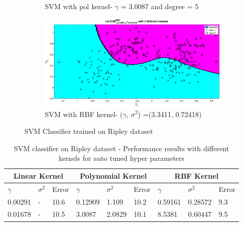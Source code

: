 {\begin{figure}[!ht]
\begin{subfigure}{.35\textwidth}
		\caption{SVM with pol kernel- $\gamma$ = 3.0087 and degree = 5}
		\label{fig:ripley_poly_svm}
	\end{subfigure}%
	\begin{subfigure}{.35\textwidth}
		\centering
		\captionsetup{width=0.8\linewidth}
		\includegraphics[height=.65\linewidth, width=0.9\linewidth]{Exercise1/Report/ripley/ripley_RBF_svm.eps}
		\caption{SVM with RBF kernel- ($\gamma$, $\sigma^2$) =(3.3411, 0.72418) } 
		\label{fig:ripley_RBF_svm}
	\end{subfigure}
	\caption{SVM Classifier trained on Ripley dataset}
	\label{fig:ripley_svm}
\end{figure}
\begin{table}[!htpb]
	\begin{tabular}{ |p{1.2cm}|p{1.2cm}|p{1.2cm}||p{1.2cm}|p{1.2cm}|p{1.2cm}||p{1.2cm}|p{1.2cm}|p{1.2cm}|}
		\hline
		\multicolumn{3}{|c||}{Linear Kernel} &\multicolumn{3}{|c||}{Polynomial Kernel}  &\multicolumn{3}{|c|}{RBF Kernel} \\ \hline	
		\cellcolor{blue!25}$\gamma$ &\cellcolor{blue!25}$\sigma^2$ & \cellcolor{blue!25}Error & \cellcolor{blue!25}$\gamma$ &\cellcolor{blue!25}$\sigma^2$ &\cellcolor{blue!25}Error & \cellcolor{blue!25}$\gamma$ &\cellcolor{blue!25}$\sigma^2$ &\cellcolor{blue!25}Error \\ \hline
		0.00291 &-&10.6 &0.12909 &1.109 &10.2 &0.59161 &0.28572 &9.3 \\ \hline
		0.01678 &- &10.5 &3.0087 &2.0829 &10.1 &8.5381 &0.60447 &9.5 \\ \hline
	\end{tabular}
	\caption{SVM classifier on Ripley dataset - Performance results with different kernels for auto tuned hyper parameters}
	\label{table:6}

\end{table}}
